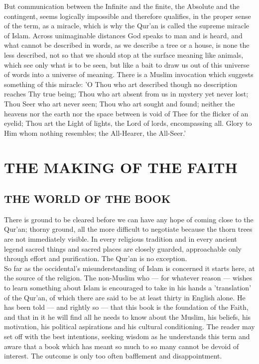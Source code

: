 \documentclass[10pt, twoside,openright]{book}
\begin{document}
But communication between the Infinite and the finite, the Absolute and the contingent, seems 
logically impossible and therefore qualifies, in the proper sense of the term, as a miracle, which is 
why the Qur'an is called the supreme miracle of Islam. Across unimaginable distances God speaks to 
man and is heard, and what cannot be described in words, as we describe a tree or a house, is none 
the less described, not so that we should stop at the surface meaning like animals, which see only 
what is to be seen, but like a bait to draw us out of this universe of words into a universe of 
meaning. There is a Muslim invocation which suggests something of this miracle: 'O Thou who art 
described though no description reaches Thy true being; Thou who art absent from us in mystery yet 
never lost; Thou Seer who art never seen; Thou who art sought and found; neither the heavens nor the 
earth nor the space between is void of Thee for the flicker of an eyelid; Thou art the Light of 
lights, the Lord of lords, encompassing all. Glory to Him whom nothing resembles; the All\hyp{}Hearer, the 
All\hyp{}Seer.' \\


\part{THE MAKING OF THE FAITH}
\chapter{THE WORLD OF THE BOOK}

There is ground to be cleared before we can have any hope of coming close to the Qur'an; thorny 
ground, all the more difficult to negotiate because the thorn trees are not immediately visible. In 
every religious tradition and in every ancient legend sacred things and sacred places are closely 
guarded, approachable only through effort and purification. The Qur'an is no exception. \\

So far as the occidental's misunderstanding of Islam is concerned it starts here, at the source of 
the religion. The non-Muslim who --- for whatever reason --- wishes to learn something about Islam is 
encouraged to take in his hands a 'translation' of the Qur'an, of which there are said to be at least 
thirty in English alone. He has been told --- and rightly so --- that this book is the foundation of the 
Faith, and that in it he will find all he needs to know about the Muslim, his beliefs, his 
motivation, his political aspirations and his cultural conditioning. The reader may set off with the 
best intentions, seeking wisdom as he understands this term and aware that a book which has meant so 
much to so many cannot be devoid of interest. The outcome is only too often bafflement and 
disappointment. \\
\end{document}
